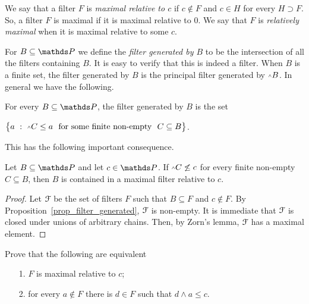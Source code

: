 \documentclass[creche.tex]{subfiles}
\begin{document}
We say that a filter $F$ is \emph{maximal relative to $c$\/} if $c\notin F$ and $c\in H$ for every $H\supset F$.
So, a filter $F$ is maximal if it is maximal relative to $0$.
We say that  $F$ is \emph{relatively maximal\/} when it is maximal relative to some $c$.

For $B\subseteq\PP$ we define the \emph{filter generated by $B$\/} to be the intersection of all the filters containing $B$.
It is easy to verify that this is indeed a filter.
When $B$ is a finite set, the filter generated by $B$ is the principal filter generated by $\swedge B$.
In general we have the following.


\begin{proposition} \label{prop_filter_generated}
For every $B\subseteq \PP$, the filter generated by $B$ is the set

\hfill$\big\{a\ :\ \swedge C\le a\ \textrm{ for some finite non-empty }\ C\subseteq B\big\}$.\QED
\end{proposition}

This has the following important consequence.

\begin{proposition}\label{esistenzamassimale2}
Let $B\subseteq \PP$ and let $c\in \PP$.
If $\swedge C\not\le c$ for every finite non-empty $C\subseteq B$, then $B$ is contained in a maximal filter relative to $c$.
\end{proposition}

\begin{proof}
Let $\EuScript F$ be the set of filters $F$ such that $B\subseteq F$ and $c\notin F$.
By Proposition~\ref{prop_filter_generated}, $\EuScript F$ is non-empty.
It is immediate that $\EuScript F$ is closed under unions of arbitrary chains.
Then, by Zorn's lemma, $\EuScript F$ has a maximal element.
\end{proof}

\begin{exercise}\label{ex_maximal_equivalent}
Prove that the following are equivalent
\begin{itemize}
\item[1.] $F$ is maximal relative to $c$;
\item[2.] for every $a\notin F$ there is $d\in F$ such that $d\wedge a\le c$.\QED
\end{itemize}
\end{exercise}
\end{document}
